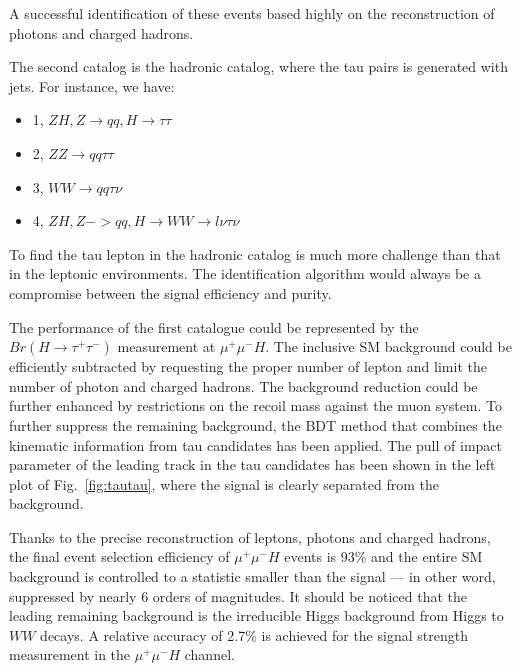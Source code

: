 A successful identification of these events based highly on the reconstruction of photons and charged hadrons. 

The second catalog is the hadronic catalog, where the tau pairs is generated with jets. For instance, we have: 

\begin{itemize}
\item[]1, $ZH, Z \to qq, H \to \tau\tau$

\item[]2, $ZZ \to qq \tau\tau$

\item[]3, $WW \to qq \tau\nu$

\item[]4, $ZH, Z->qq, H \to WW \to l\nu \tau\nu$
\end{itemize}


To find the tau lepton in the hadronic catalog is much more challenge than that in the leptonic environments.
The identification algorithm would always be a compromise between the signal efficiency and purity. 

The performance of the first catalogue could be represented by the $Br(H\to\tau^+\tau^-)$ measurement at $\mu^+\mu^- H$.
The inclusive SM background could be efficiently subtracted by requesting the proper number of lepton
and limit the number of photon and charged hadrons.
The background reduction could be further enhanced by restrictions on the recoil mass against the muon system.
To further suppress the remaining background,
the BDT method that combines the kinematic information from tau candidates has been applied.
The pull of impact parameter of the leading track in the tau candidates has been shown in the left plot of Fig.~\ref{fig:tautau},
where the signal is clearly separated from the background. 

Thanks to the precise reconstruction of leptons, photons and charged hadrons,
the final event selection efficiency of $\mu^+\mu^-H$ events is 93\%
and the entire SM background is controlled to a statistic smaller than the signal ---
in other word, suppressed by nearly 6 orders of magnitudes.
It should be noticed that the leading remaining background is the irreducible Higgs background from Higgs to $WW$ decays.
A relative accuracy of 2.7\% is achieved for the signal strength measurement in the $\mu^+\mu^- H$ channel. 

